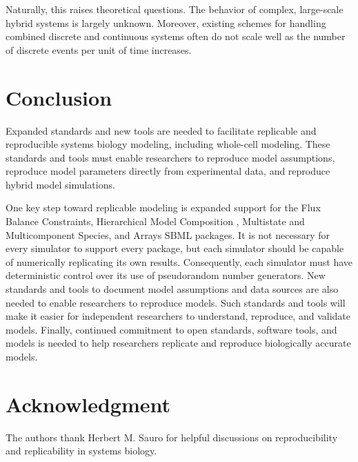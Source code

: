 \documentclass[journal,transmag,twoside]{IEEEtran}
\begin{document}
Naturally, this raises theoretical questions. The behavior of complex, large-scale hybrid systems is largely unknown. Moreover, existing schemes for handling combined discrete and continuous systems often do not scale well as the number of discrete events per unit of time increases.

\section{Conclusion}

Expanded standards and new tools are needed to facilitate replicable and reproducible systems biology modeling, including whole-cell modeling.
These standards and tools must enable researchers to reproduce model assumptions, reproduce model parameters
directly from experimental data, and reproduce hybrid model simulations. 

One key step toward replicable modeling is expanded support for the 
Flux Balance Constraints, Hierarchical Model Composition \cite{smith2015sbml}, Multistate and Multicomponent
Species, and Arrays \cite{watanabe2016efficient} SBML packages. It is not necessary for every simulator
to support every package, but each simulator should be capable of numerically replicating its own results.
Consequently, each simulator must have deterministic control over its use of pseudorandom number generators.
New standards and tools to document model assumptions and data sources are also needed to enable researchers to reproduce models.
Such standards and tools will make it easier for independent researchers to understand, reproduce, and validate models. 
Finally, continued commitment to open standards, software tools, and models is needed to help researchers replicate and reproduce biologically accurate models.

\section{Acknowledgment}

The authors thank Herbert M. Sauro for helpful discussions
on reproducibility and replicability in systems biology.

\ifCLASSOPTIONcaptionsoff
  \newpage
\fi



\end{document}
